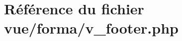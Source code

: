 \hypertarget{v__footer_8php}{}\section{Référence du fichier vue/forma/v\+\_\+footer.php}
\label{v__footer_8php}
